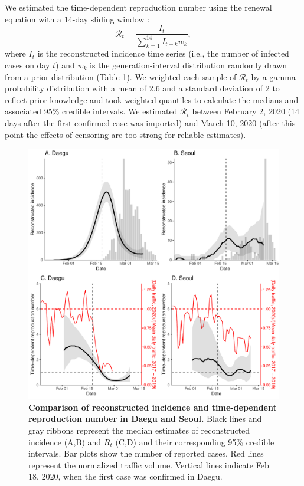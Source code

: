 \documentclass[12pt]{article}
\begin{document}
We estimated the time-dependent reproduction number using the renewal equation with a 14-day sliding window \citep{fraser2007estimating}:
\begin{equation}
\mathcal R_t = \frac{I_t}{\sum_{k=1}^{14} I_{t-k} w_k},
\end{equation}
where $I_t$ is the reconstructed incidence time series (i.e., the number of infected cases on day $t$) and $w_k$ is the generation-interval distribution randomly drawn from a prior distribution (Table 1).
We weighted each sample of $\mathcal R_t$ by a gamma probability distribution with a mean of 2.6 and a standard deviation of 2 to reflect prior knowledge \citep{tempvar} and took weighted quantiles to calculate the medians and associated 95\% credible intervals.
We estimated $\mathcal R_t$ between February 2, 2020 (14 days after the first confirmed case was imported) and March 10, 2020 (after this point the effects of censoring are too strong for reliable estimates).

\begin{figure}[!ht]
\includegraphics[width=\textwidth]{figure_compare_R_t.pdf}
\caption{
\textbf{Comparison of reconstructed incidence and time-dependent reproduction number in Daegu and Seoul.}
Black lines and gray ribbons represent the median estimates of reconstructed incidence (A,B) and $R_t$ (C,D) and their corresponding 95\% credible intervals.
Bar plots show the number of reported cases.
Red lines represent the normalized traffic volume.
Vertical lines indicate Feb 18, 2020, when the first case was confirmed in Daegu.
}
\label{fig:eff}
\end{figure}
\end{document}
